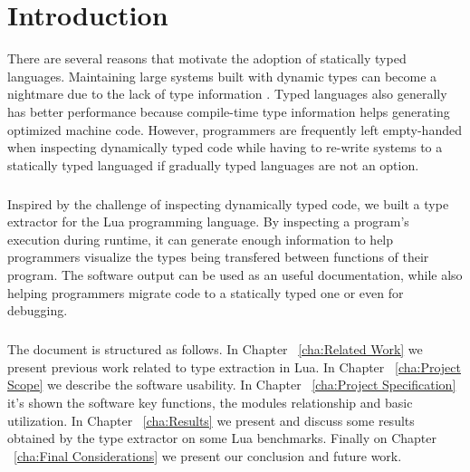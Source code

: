 
\chapter{Introduction}
There are several reasons that motivate the adoption of statically typed languages. Maintaining large systems built with dynamic types can become a nightmare due to the lack of type information \cite{takikawa_is_2016}. Typed languages also generally has better performance because compile-time type information helps generating optimized machine code. However, programmers are frequently left empty-handed when inspecting dynamically typed code while having to re-write systems to a statically typed languaged if gradually typed languages are not an option.
\paragraph*{}
Inspired by the challenge of inspecting dynamically typed code, we built a type extractor for the Lua programming language. By inspecting a program's execution during runtime, it can generate enough information to help programmers visualize the types being transfered between functions of their program. The software output can be used as an useful documentation, while also helping programmers migrate code to a statically typed one or even for debugging.
\paragraph*{}
The document is structured as follows. In Chapter ~\ref{cha:Related Work} we present previous work related to type extraction in Lua. In Chapter ~\ref{cha:Project Scope} we describe the software usability. In Chapter ~\ref{cha:Project Specification} it's shown the software key functions, the modules relationship and basic utilization. In Chapter ~\ref{cha:Results} we present and discuss some results obtained by the type extractor on some Lua benchmarks. Finally on Chapter ~\ref{cha:Final Considerations} we present our conclusion and future work.





